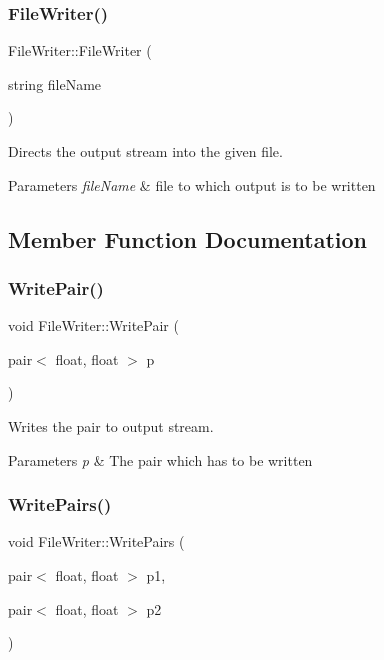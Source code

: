 \subsubsection{\texorpdfstring{File\+Writer()}{FileWriter()}}
{\footnotesize\ttfamily File\+Writer\+::\+File\+Writer (\begin{DoxyParamCaption}\item[{string}]{file\+Name }\end{DoxyParamCaption})}



Directs the output stream into the given file. 


\begin{DoxyParams}{Parameters}
{\em file\+Name} & file to which output is to be written \\
\hline
\end{DoxyParams}


\subsection{Member Function Documentation}
\mbox{\label{classFileWriter_a383f29a30951f0cba784416a679df6f6}} 
\subsubsection{\texorpdfstring{Write\+Pair()}{WritePair()}}
{\footnotesize\ttfamily void File\+Writer\+::\+Write\+Pair (\begin{DoxyParamCaption}\item[{pair$<$ float, float $>$}]{p }\end{DoxyParamCaption})}



Writes the pair to output stream. 


\begin{DoxyParams}{Parameters}
{\em p} & The pair which has to be written \\
\hline
\end{DoxyParams}
\mbox{\label{classFileWriter_afe122f1d6ab2085a2df3bff1eda1c300}} 
\subsubsection{\texorpdfstring{Write\+Pairs()}{WritePairs()}}
{\footnotesize\ttfamily void File\+Writer\+::\+Write\+Pairs (\begin{DoxyParamCaption}\item[{pair$<$ float, float $>$}]{p1,  }\item[{pair$<$ float, float $>$}]{p2 }\end{DoxyParamCaption})}



